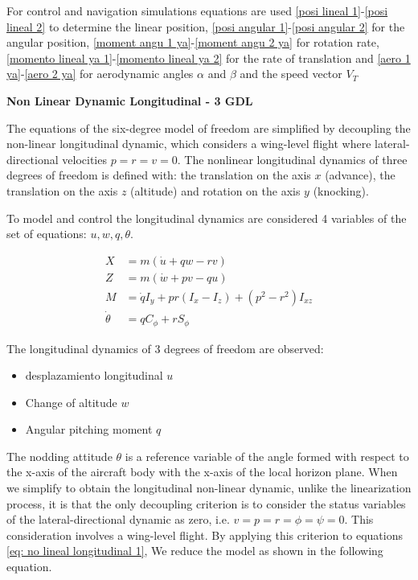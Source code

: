 For control and navigation simulations equations are used \ref{posi lineal 1}-\ref{posi lineal 2} to determine the linear position, \ref{posi angular 1}-\ref{posi angular 2} for the angular position,  \ref{moment angu 1 ya}-\ref{moment angu 2 ya} for rotation rate, \ref{momento lineal ya 1}-\ref{momento lineal ya 2} for the rate of translation and \ref{aero 1 ya}-\ref{aero 2 ya} for aerodynamic angles $\alpha$ and $\beta$ and the speed vector $V_T$
\bigskip

\textbf{Non Linear Dynamic Longitudinal - 3 GDL}

The equations of the six-degree model of freedom are simplified by decoupling the non-linear longitudinal dynamic, which considers a wing-level flight where lateral-directional velocities $p=r=v=0$. The nonlinear longitudinal dynamics of three degrees of freedom is defined with: the translation on the axis $x$ (advance), the translation on the axis $z$ (altitude) and rotation on the axis $y$ (knocking). 

To model and control the longitudinal dynamics are considered 4 variables of the set of equations: $u, w, q, \theta$. 

\begin{align} 
\label{eq: no lineal longitudinal 1}
X &= m (\dot u + qw - rv) \\
Z &= m (\dot w + pv - qu) \\
M &=  \dot q I_{y} + pr(I_{x} - I_{z}) + (p^2 - r^2) I_{xz} \\
\dot \theta &= q C_{\phi} + r S_{\phi}
\end{align}

The longitudinal dynamics of 3 degrees of freedom are observed:

\begin{itemize}
    \item desplazamiento longitudinal $u$
    \item Change of altitude $w$
    \item Angular pitching moment $q$
\end{itemize}

The nodding attitude $\theta$ is a reference variable of the angle formed with respect to the x-axis of the aircraft body with the x-axis of the local horizon plane.
%
When we simplify to obtain the longitudinal non-linear dynamic, unlike the linearization process, it is that the only decoupling criterion is to consider the status variables of the lateral-directional dynamic as zero, i.e. $v=p=r=\phi=\psi=0$. This consideration involves a wing-level flight. By applying this criterion to equations \ref{eq: no lineal longitudinal 1}, We reduce the model as shown in the following equation. 

